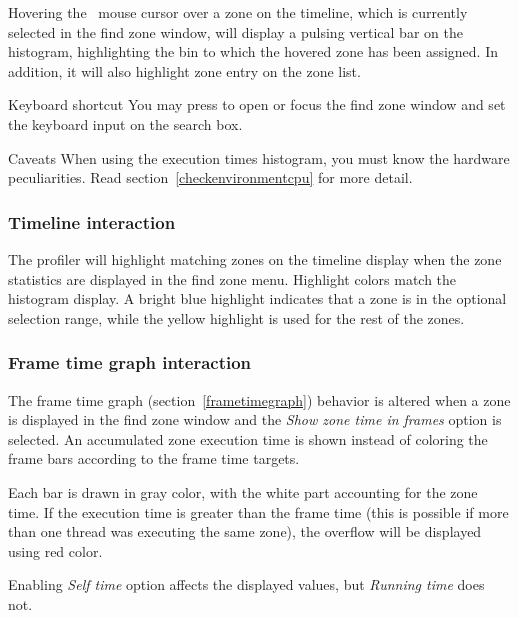 \documentclass[hidelinks,titlepage,a4paper,twoside]{article}
\begin{document}
Hovering the \faMousePointer{}~mouse cursor over a zone on the timeline, which is currently selected in the find zone window, will display a pulsing vertical bar on the histogram, highlighting the bin to which the hovered zone has been assigned. In addition, it will also highlight zone entry on the zone list.

\begin{bclogo}[
noborder=true,
couleur=black!5,
logo=\bclampe
]{Keyboard shortcut}
You may press  to open or focus the find zone window and set the keyboard input on the search box.
\end{bclogo}

\begin{bclogo}[
noborder=true,
couleur=black!5,
logo=\bcattention
]{Caveats}
When using the execution times histogram, you must know the hardware peculiarities. Read section~\ref{checkenvironmentcpu} for more detail.
\end{bclogo}

\subsubsection{Timeline interaction}

The profiler will highlight matching zones on the timeline display when the zone statistics are displayed in the find zone menu. Highlight colors match the histogram display. A bright blue highlight indicates that a zone is in the optional selection range, while the yellow highlight is used for the rest of the zones.

\subsubsection{Frame time graph interaction}
\label{frametimefindzone}

The frame time graph (section~\ref{frametimegraph}) behavior is altered when a zone is displayed in the find zone window and the \emph{Show zone time in frames} option is selected. An accumulated zone execution time is shown instead of coloring the frame bars according to the frame time targets.

Each bar is drawn in gray color, with the white part accounting for the zone time. If the execution time is greater than the frame time (this is possible if more than one thread was executing the same zone), the overflow will be displayed using red color.

Enabling \emph{Self time} option affects the displayed values, but \emph{Running time} does not.
\end{document}
